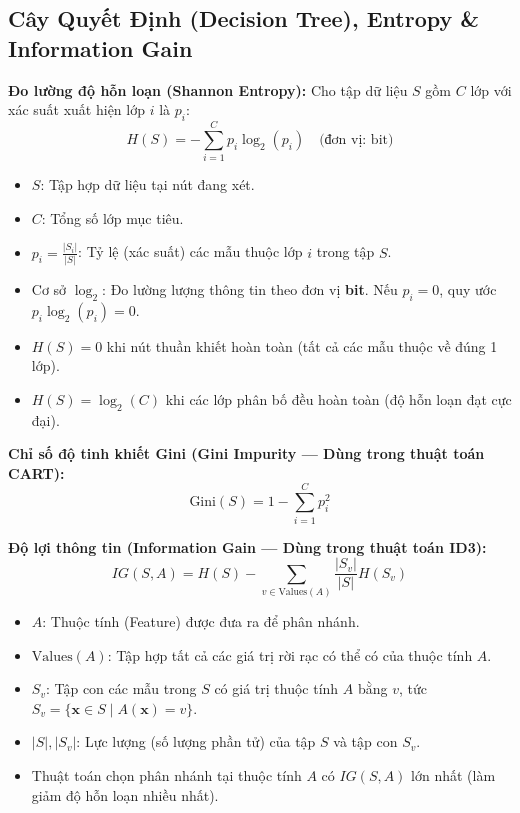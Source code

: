 \documentclass[10pt,a4paper]{article}
\begin{document}
\subsection{Cây Quyết Định (Decision Tree), Entropy \& Information Gain}
\textbf{Đo lường độ hỗn loạn (Shannon Entropy):} Cho tập dữ liệu $S$ gồm $C$ lớp với xác suất xuất hiện lớp $i$ là $p_i$:
\begin{equation}
    H(S) = -\sum_{i=1}^C p_i \log_2(p_i) \quad \text{(đơn vị: bit)}
\end{equation}
\begin{itemize}[leftmargin=*]
    \item $S$: Tập hợp dữ liệu tại nút đang xét.
    \item $C$: Tổng số lớp mục tiêu.
    \item $p_i = \frac{|S_i|}{|S|}$: Tỷ lệ (xác suất) các mẫu thuộc lớp $i$ trong tập $S$.
    \item Cơ sở $\log_2$: Đo lường lượng thông tin theo đơn vị \textbf{bit}. Nếu $p_i = 0$, quy ước $p_i \log_2(p_i) = 0$.
    \item $H(S) = 0$ khi nút thuần khiết hoàn toàn (tất cả các mẫu thuộc về đúng 1 lớp).
    \item $H(S) = \log_2(C)$ khi các lớp phân bố đều hoàn toàn (độ hỗn loạn đạt cực đại).
\end{itemize}

\textbf{Chỉ số độ tinh khiết Gini (Gini Impurity --- Dùng trong thuật toán CART):}
\begin{equation}
    \text{Gini}(S) = 1 - \sum_{i=1}^C p_i^2
\end{equation}

\textbf{Độ lợi thông tin (Information Gain --- Dùng trong thuật toán ID3):}
\begin{equation}
    IG(S, A) = H(S) - \sum_{v \in \text{Values}(A)} \frac{|S_v|}{|S|} H(S_v)
\end{equation}
\begin{itemize}[leftmargin=*]
    \item $A$: Thuộc tính (Feature) được đưa ra để phân nhánh.
    \item $\text{Values}(A)$: Tập hợp tất cả các giá trị rời rạc có thể có của thuộc tính $A$.
    \item $S_v$: Tập con các mẫu trong $S$ có giá trị thuộc tính $A$ bằng $v$, tức $S_v = \{\mathbf{x} \in S \mid A(\mathbf{x}) = v\}$.
    \item $|S|, |S_v|$: Lực lượng (số lượng phần tử) của tập $S$ và tập con $S_v$.
    \item Thuật toán chọn phân nhánh tại thuộc tính $A$ có $IG(S, A)$ lớn nhất (làm giảm độ hỗn loạn nhiều nhất).
\end{itemize}
\end{document}
